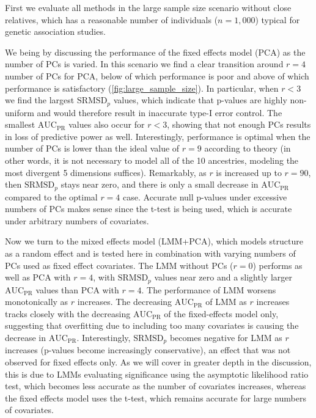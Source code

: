 \documentclass[11pt]{article}
\newcommand{\rmsd}{\text{SRMSD}_p}
\newcommand{\auc}{\text{AUC}_\text{PR}}
\begin{document}
First we evaluate all methods in the large sample size scenario without close relatives, which has a reasonable number of individuals ($n = 1,000$) typical for genetic association studies.

We being by discussing the performance of the fixed effects model (PCA) as the number of PCs is varied.
In this scenario we find a clear transition around $r = 4$ number of PCs for PCA, below of which performance is poor and above of which performance is satisfactory (\cref{fig:large_sample_size}).
In particular, when $r < 3$ we find the largest $\rmsd$ values, which indicate that p-values are highly non-uniform and would therefore result in inaccurate type-I error control.
The smallest $\auc$ values also occur for $r < 3$, showing that not enough PCs results in loss of predictive power as well.
Interestingly, performance is optimal when the number of PCs is lower than the ideal value of $r=9$ according to theory (in other words, it is not necessary to model all of the 10 ancestries, modeling the most divergent 5 dimensions suffices).
Remarkably, as $r$ is increased up to $r = 90$, then $\rmsd$ stays near zero, and there is only a small decrease in $\auc$ compared to the optimal $r = 4$ case.
Accurate null p-values under excessive numbers of PCs makes sense since the t-test is being used, which is accurate under arbitrary numbers of covariates.

Now we turn to the mixed effects model (LMM+PCA), which models structure as a random effect and is tested here in combination with varying numbers of PCs used as fixed effect covariates.
The LMM without PCs ($r=0$) performs as well as PCA with $r = 4$, with $\rmsd$ values near zero and a slightly larger $\auc$ values than PCA with $r = 4$.
The performance of LMM worsens monotonically as $r$ increases.
The decreasing $\auc$ of LMM as $r$ increases tracks closely with the decreasing $\auc$ of the fixed-effects model only, suggesting that overfitting due to including too many covariates is causing the decrease in $\auc$.
Interestingly, $\rmsd$ becomes negative for LMM as $r$ increases (p-values become increasingly conservative), an effect that was not observed for fixed effects only.
As we will cover in greater depth in the discussion, this is due to LMMs evaluating significance using the asymptotic likelihood ratio test, which becomes less accurate as the number of covariates increases, whereas the fixed effects model uses the t-test, which remains accurate for large numbers of covariates.
\end{document}
